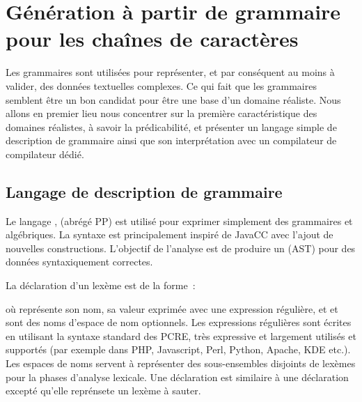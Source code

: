\section{Génération à partir de grammaire pour les chaînes de caractères}
\label{section:data:strings}

Les grammaires sont utilisées pour représenter, et par conséquent au moins à
valider, des données textuelles complexes. Ce qui fait que les grammaires
semblent être un bon candidat pour être une base d'un domaine réaliste. Nous
allons en premier lieu nous concentrer sur la première caractéristique des
domaines réalistes, à savoir la prédicabilité, et présenter un langage simple de
description de grammaire ainsi que son interprétation avec un compilateur de
compilateur dédié.

\subsection{Langage de description de grammaire}
\label{subsection:data:pp}

Le langage , (abrégé PP) est utilisé pour exprimer
simplement des grammaires  et algébriques. La syntaxe est
principalement inspiré de JavaCC avec l'ajout de nouvelles constructions.
L'objectif de l'analyse est de produire un 
(AST) pour des données syntaxiquement correctes.

La déclaration d'un lexème est de la forme~:

\begin{pre}
\end{pre}
%
où  représente son nom,  sa valeur exprimée avec une
expression régulière, et  et  sont des noms
d'espace de nom optionnels. Les expressions régulières sont écrites en utilisant
la syntaxe standard des PCRE, très expressive et largement utilisés et supportés
(par exemple dans PHP, Javascript, Perl, Python, Apache, KDE etc.). Les espaces
de noms servent à représenter des sous-ensembles disjoints de lexèmes pour la
phases d'analyse lexicale. Une déclaration  est similaire à une
déclaration  excepté qu'elle reprénsete un lexème à sauter.


